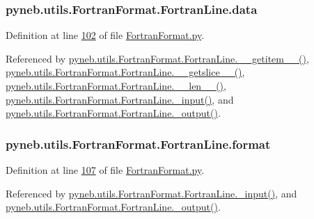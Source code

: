 \subsubsection[{data}]{\setlength{\rightskip}{0pt plus 5cm}pyneb.\+utils.\+Fortran\+Format.\+Fortran\+Line.\+data}\label{classpyneb_1_1utils_1_1_fortran_format_1_1_fortran_line_a5976b8e1d4375a2ea62b9359bcf84697}


Definition at line \hyperlink{_fortran_format_8py_source_l00102}{102} of file \hyperlink{_fortran_format_8py_source}{Fortran\+Format.\+py}.



Referenced by \hyperlink{_fortran_format_8py_source_l00123}{pyneb.\+utils.\+Fortran\+Format.\+Fortran\+Line.\+\_\+\+\_\+getitem\+\_\+\+\_\+()}, \hyperlink{_fortran_format_8py_source_l00131}{pyneb.\+utils.\+Fortran\+Format.\+Fortran\+Line.\+\_\+\+\_\+getslice\+\_\+\+\_\+()}, \hyperlink{_fortran_format_8py_source_l00116}{pyneb.\+utils.\+Fortran\+Format.\+Fortran\+Line.\+\_\+\+\_\+len\+\_\+\+\_\+()}, \hyperlink{_fortran_format_8py_source_l00155}{pyneb.\+utils.\+Fortran\+Format.\+Fortran\+Line.\+\_\+input()}, and \hyperlink{_fortran_format_8py_source_l00195}{pyneb.\+utils.\+Fortran\+Format.\+Fortran\+Line.\+\_\+output()}.

\hypertarget{classpyneb_1_1utils_1_1_fortran_format_1_1_fortran_line_ae97c8744bdb9817ec8a9c58b7a6bfe20}{}
\subsubsection[{format}]{\setlength{\rightskip}{0pt plus 5cm}pyneb.\+utils.\+Fortran\+Format.\+Fortran\+Line.\+format}\label{classpyneb_1_1utils_1_1_fortran_format_1_1_fortran_line_ae97c8744bdb9817ec8a9c58b7a6bfe20}


Definition at line \hyperlink{_fortran_format_8py_source_l00107}{107} of file \hyperlink{_fortran_format_8py_source}{Fortran\+Format.\+py}.



Referenced by \hyperlink{_fortran_format_8py_source_l00155}{pyneb.\+utils.\+Fortran\+Format.\+Fortran\+Line.\+\_\+input()}, and \hyperlink{_fortran_format_8py_source_l00195}{pyneb.\+utils.\+Fortran\+Format.\+Fortran\+Line.\+\_\+output()}.

